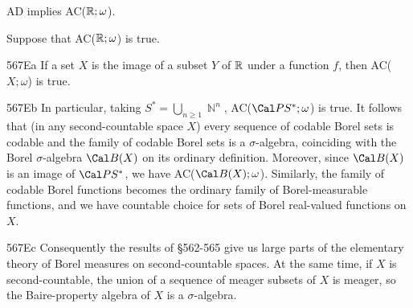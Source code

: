 
AD implies AC($\Bbb R;\omega$).


 Suppose that
AC($\Bbb R;\omega$) is true.

\spheader 567Ea If a set $X$ is the image of a subset $Y$ of $\Bbb R$
under a function $f$, then AC($X;\omega$) is true.   

\spheader 567Eb In particular, taking
$S^*=\bigcup_{n\ge 1}\BbbN^n$, AC($\Cal PS^*;\omega$) is true.   It follows that (in any
second-countable space $X$) every sequence of
codable Borel sets is codable and the family of codable Borel sets is a
$\sigma$-algebra, coinciding with the Borel $\sigma$-algebra $\Cal B(X)$
on its
ordinary definition.   Moreover, since $\Cal B(X)$ is an image of
$\Cal PS^*$, we have AC($\Cal B(X);\omega$).  Similarly, the family of codable Borel functions
becomes the ordinary family of Borel-measurable functions, and we have
countable choice for sets of Borel real-valued functions on $X$.

\spheader 567Ec Consequently the results of \S562-565 give us
large parts of the elementary theory of Borel measures on
second-countable spaces.   At the same time, if $X$ is second-countable,
the union of a sequence of meager subsets of $X$ is
meager, so the
Baire-property algebra of $X$ is a $\sigma$-algebra.

